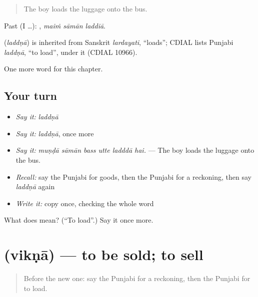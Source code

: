 \begin{quote}
The boy loads the luggage onto the bus.
\end{quote}

Past (I …):   , \emph{maiṁ sāmān laddiā}.

\begin{cousinweb}
\textbf{} (\emph{laddṇā}) is inherited from Sanskrit \emph{lardayati}, \textquotedblleft{}loads\textquotedblright{}; CDIAL lists Punjabi \emph{laddṇā}, \textquotedblleft{}to load\textquotedblright{}, under it (CDIAL 10966).
\end{cousinweb}

\begin{grammarlens}[title={What you've built}]
One more word for this chapter.
\end{grammarlens}

\subsection*{Your turn}
\begin{itemize}
\raggedright
  \item \emph{Say it:} \emph{laddṇā}
  \item \emph{Say it:} \emph{laddṇā}, once more
  \item \emph{Say it:} \emph{muṇḍā sāmān bass utte ladddā hai.} — The boy loads the luggage onto the bus.
  \item \emph{Recall:} say the Punjabi for goods, then the Punjabi for a reckoning, then say \emph{laddṇā} again
  \item \emph{Write it:} copy \textbf{} once, checking the whole word
\end{itemize}

\begin{tcolorbox}[breakable,colback=teal!4,colframe=teal!35!black,title={Before you move on}]
What does  mean? (\textquotedblleft{}To load\textquotedblright{}.) Say it once more.
\end{tcolorbox}
\section[\texorpdfstring{\pa{ਵਿਕਣਾ} (vikṇā)}{ਵਿਕਣਾ (vikṇā)}]{ (vikṇā) — to be sold; to sell}

\label{lesson:PA-C278-vikna}



\begin{quote}
Before the new one: say the Punjabi for a reckoning, then the Punjabi for to load.
\end{quote}

